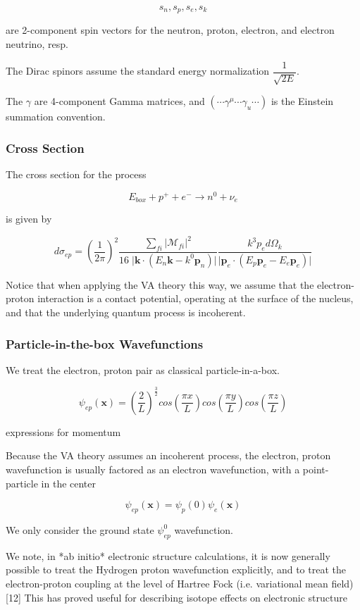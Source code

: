 \documentclass[11pt]{amsart}
\begin{document}
$$s_{n}, s_{p},s_{e},s_{k}$$ 

are 2-component spin vectors for the neutron, proton, electron, and electron neutrino, resp. 

The Dirac spinors assume the standard energy normalization $\dfrac{1}{\sqrt{2E}}$.

The $\gamma$ are 4-component Gamma matrices, and  $(\cdots\gamma^{\mu}\cdots\gamma_{u}\cdots)$ is the Einstein summation convention.


\subsubsection{Cross Section}

The cross section for the process

$$E_{box}+p^{+}+e^{-}\rightarrow n^{0}+\nu_{e}$$

is given by 

$$d\sigma_{ep}=\left(\dfrac{1}{2\pi}\right)^{2}\dfrac{\sum_{fi}\big\vert\mathcal{M}_{fi}\big\vert^{2}}{16\;\big\vert\mathbf{k}\cdot(E{_n}\mathbf{k}-k^{0}\mathbf{p}_{n})\big\vert}\dfrac{k^{3}p_{e}d\Omega_{k}}{\big\vert\mathbf{p}_{e}\cdot(E_{p}\mathbf{p}_{e}-E_{e}\mathbf{p}_{e})\big\vert}$$

Notice that when applying the VA theory this way, we assume that the electron-proton interaction is a contact potential, operating at the surface of the nucleus, and that the underlying quantum process is incoherent.  

\subsubsection{Particle-in-the-box Wavefunctions}


We treat the electron, proton pair as classical particle-in-a-box.

$$\psi_{ep}(\mathbf{x})=\left(\dfrac{2}{L}\right)^{\frac{3}{2}}cos\left(\dfrac{\pi x}{L}\right)cos\left(\dfrac{\pi y}{L}\right)cos\left(\dfrac{\pi z}{L}\right)$$

expressions for momentum

Because the VA theory assumes an incoherent process, the electron, proton wavefunction is usually factored as an electron wavefunction, with a point-particle in the center

$$\psi_{ep}(\mathbf{x})=\psi_{p}(0)\psi_{e}(\mathbf{x})$$

We only consider the  ground state $\psi_{ep}^{0}$ wavefunction.


We note, in *ab initio* electronic structure calculations, it is now generally possible to treat the Hydrogen proton wavefunction explicitly, and to treat the electron-proton coupling at the level of Hartree Fock (i.e. variational mean field) [12] This has proved useful for describing isotope effects on electronic structure
\end{document}
